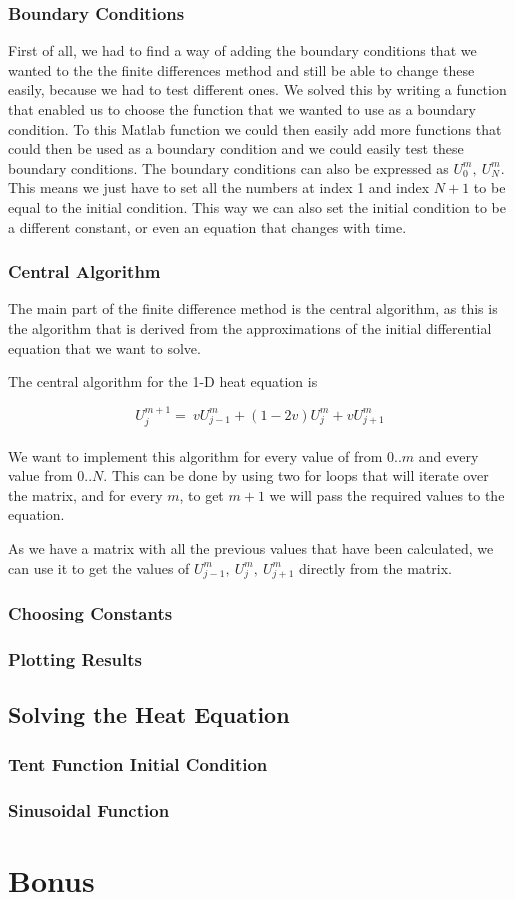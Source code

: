 \documentclass[12pt,twoside]{article}
\begin{document}
\subsubsection{Boundary Conditions}

First of all, we had to find a way of adding the boundary conditions that we wanted to the the finite differences method
and still be able to change these easily, because we had to test different ones. We solved this by writing a function that enabled us
to choose the function that we wanted to use as a boundary condition. To this Matlab function we could then easily add more functions
that could then be used as a boundary condition and we could easily test these boundary conditions. The boundary conditions 
can also be expressed as \( U_0^m,\ U_N^m \). This means we just have to set all the numbers at index 1 and index \( N+1 \) to 
be equal to the initial condition. This way we can also set the initial condition to be a different constant, or even an equation that
changes with time.


\subsubsection{Central Algorithm}

The main part of the finite difference method is the central algorithm, as this is the algorithm that is derived from the approximations
of the initial differential equation that we want to solve. 

The central algorithm for the 1-D heat equation is

\[
U_{j}^{m+1} =\ v U_{j-1}^{m} + (1 - 2 v) U_{j}^{m} + v U_{j+1}^{m}
\]\\

We want to implement this algorithm for every value of from \( 0..m \) and every value from \( 0..N \). This can be done by using two 
for loops that will iterate over the matrix, and for every \( m \), to get \( m+1 \) we will pass the required values to the equation.

As we have a matrix with all the previous values that have been calculated, we can use it to get the values of \( U_{j-1}^m,\ U_j^m,\ 
U_{j+1}^m \) directly from the matrix. 


\subsubsection{Choosing Constants}

\subsubsection{Plotting Results}


\subsection{Solving the Heat Equation}

\subsubsection{Tent Function Initial Condition}

\subsubsection{Sinusoidal Function}


\section{Bonus}
\end{document}
